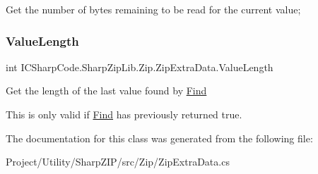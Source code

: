 Get the number of bytes remaining to be read for the current value; 

\mbox{\label{class_i_c_sharp_code_1_1_sharp_zip_lib_1_1_zip_1_1_zip_extra_data_a907c421a470d5c038fa18e696a84166c}} 
\subsubsection{\texorpdfstring{Value\+Length}{ValueLength}}
{\footnotesize\ttfamily int I\+C\+Sharp\+Code.\+Sharp\+Zip\+Lib.\+Zip.\+Zip\+Extra\+Data.\+Value\+Length\hspace{0.3cm}{\ttfamily [get]}}



Get the length of the last value found by \hyperlink{class_i_c_sharp_code_1_1_sharp_zip_lib_1_1_zip_1_1_zip_extra_data_a91e0c6c1d11967653256ccb161f9818c}{Find} 

This is only valid if \hyperlink{class_i_c_sharp_code_1_1_sharp_zip_lib_1_1_zip_1_1_zip_extra_data_a91e0c6c1d11967653256ccb161f9818c}{Find} has previously returned true.

The documentation for this class was generated from the following file\+:\begin{DoxyCompactItemize}
\item 
Project/\+Utility/\+Sharp\+Z\+I\+P/src/\+Zip/Zip\+Extra\+Data.\+cs\end{DoxyCompactItemize}
